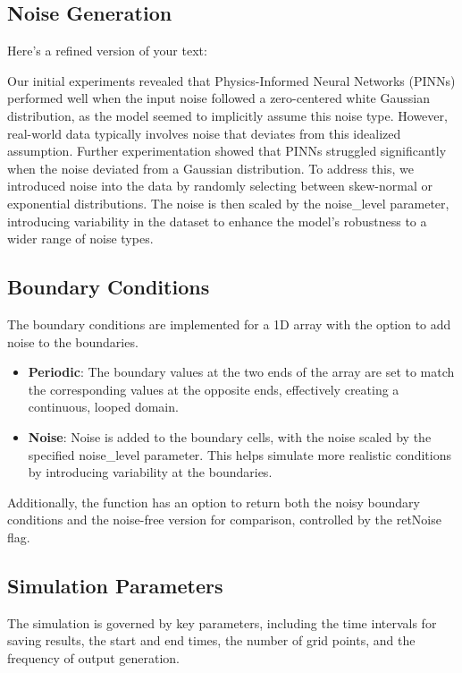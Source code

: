 \documentclass[conference]{IEEEtran}
\begin{document}
\subsection{Noise Generation}
Here's a refined version of your text:

Our initial experiments revealed that Physics-Informed Neural Networks (PINNs) performed well when the input noise followed a zero-centered white Gaussian distribution, as the model seemed to implicitly assume this noise type. However, real-world data typically involves noise that deviates from this idealized assumption. Further experimentation showed that PINNs struggled significantly when the noise deviated from a Gaussian distribution. To address this, we introduced noise into the data by randomly selecting between skew-normal or exponential distributions. The noise is then scaled by the noise\_level parameter, introducing variability in the dataset to enhance the model's robustness to a wider range of noise types.

\subsection{Boundary Conditions}

The boundary conditions are implemented for a 1D array with the option to add noise to the boundaries. 

\begin{itemize} \item \textbf{Periodic}: The boundary values at the two ends of the array are set to match the corresponding values at the opposite ends, effectively creating a continuous, looped domain. \item \textbf{Noise}: Noise is added to the boundary cells, with the noise scaled by the specified noise\_level parameter. This helps simulate more realistic conditions by introducing variability at the boundaries. \end{itemize}

Additionally, the function has an option to return both the noisy boundary conditions and the noise-free version for comparison, controlled by the retNoise flag.

\subsection{Simulation Parameters}
The simulation is governed by key parameters, including the time intervals for saving results, the start and end times, the number of grid points, and the frequency of output generation. 
\end{document}
